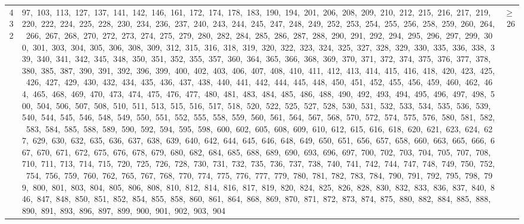 \begin{longtable}{c|p{}|r}
432 & 97,\ 103,\ 113,\ 127,\ 137,\ 141,\ 142,\ 146,\ 161,\ 172,\ 174,\ 178,\ 183,\ 190,\ 194,\ 201,\ 206,\ 208,\ 209,\ 210,\ 212,\ 215,\ 216,\ 217,\ 219,\ 220,\ 222,\ 224,\ 225,\ 228,\ 230,\ 234,\ 236,\ 237,\ 240,\ 243,\ 244,\ 245,\ 247,\ 248,\ 249,\ 252,\ 253,\ 254,\ 255,\ 256,\ 258,\ 259,\ 260,\ 264,\ 266,\ 267,\ 268,\ 270,\ 272,\ 273,\ 274,\ 275,\ 279,\ 280,\ 282,\ 284,\ 285,\ 286,\ 287,\ 288,\ 290,\ 291,\ 292,\ 294,\ 295,\ 296,\ 297,\ 299,\ 300,\ 301,\ 303,\ 304,\ 305,\ 306,\ 308,\ 309,\ 312,\ 315,\ 316,\ 318,\ 319,\ 320,\ 322,\ 323,\ 324,\ 325,\ 327,\ 328,\ 329,\ 330,\ 335,\ 336,\ 338,\ 339,\ 340,\ 341,\ 342,\ 345,\ 348,\ 350,\ 351,\ 352,\ 355,\ 357,\ 360,\ 364,\ 365,\ 366,\ 368,\ 369,\ 370,\ 371,\ 372,\ 374,\ 375,\ 376,\ 377,\ 378,\ 380,\ 385,\ 387,\ 390,\ 391,\ 392,\ 396,\ 399,\ 400,\ 402,\ 403,\ 406,\ 407,\ 408,\ 410,\ 411,\ 412,\ 413,\ 414,\ 415,\ 416,\ 418,\ 420,\ 423,\ 425,\ 426,\ 427,\ 429,\ 430,\ 432,\ 434,\ 435,\ 436,\ 437,\ 438,\ 440,\ 441,\ 442,\ 444,\ 445,\ 448,\ 450,\ 451,\ 452,\ 455,\ 456,\ 459,\ 460,\ 462,\ 464,\ 465,\ 468,\ 469,\ 470,\ 473,\ 474,\ 475,\ 476,\ 477,\ 480,\ 481,\ 483,\ 484,\ 485,\ 486,\ 488,\ 490,\ 492,\ 493,\ 494,\ 495,\ 496,\ 497,\ 498,\ 500,\ 504,\ 506,\ 507,\ 508,\ 510,\ 511,\ 513,\ 515,\ 516,\ 517,\ 518,\ 520,\ 522,\ 525,\ 527,\ 528,\ 530,\ 531,\ 532,\ 533,\ 534,\ 535,\ 536,\ 539,\ 540,\ 544,\ 545,\ 546,\ 548,\ 549,\ 550,\ 551,\ 552,\ 555,\ 558,\ 559,\ 560,\ 561,\ 564,\ 567,\ 568,\ 570,\ 572,\ 574,\ 575,\ 576,\ 580,\ 581,\ 582,\ 583,\ 584,\ 585,\ 588,\ 589,\ 590,\ 592,\ 594,\ 595,\ 598,\ 600,\ 602,\ 605,\ 608,\ 609,\ 610,\ 612,\ 615,\ 616,\ 618,\ 620,\ 621,\ 623,\ 624,\ 627,\ 629,\ 630,\ 632,\ 635,\ 636,\ 637,\ 638,\ 639,\ 640,\ 642,\ 644,\ 645,\ 646,\ 648,\ 649,\ 650,\ 651,\ 656,\ 657,\ 658,\ 660,\ 663,\ 665,\ 666,\ 667,\ 670,\ 671,\ 672,\ 675,\ 676,\ 678,\ 679,\ 680,\ 682,\ 684,\ 685,\ 688,\ 689,\ 690,\ 693,\ 696,\ 697,\ 700,\ 702,\ 703,\ 704,\ 705,\ 707,\ 708,\ 710,\ 711,\ 713,\ 714,\ 715,\ 720,\ 725,\ 726,\ 728,\ 730,\ 731,\ 732,\ 735,\ 736,\ 737,\ 738,\ 740,\ 741,\ 742,\ 744,\ 747,\ 748,\ 749,\ 750,\ 752,\ 754,\ 756,\ 759,\ 760,\ 762,\ 765,\ 767,\ 768,\ 770,\ 774,\ 775,\ 776,\ 777,\ 779,\ 780,\ 781,\ 782,\ 783,\ 784,\ 790,\ 791,\ 792,\ 795,\ 798,\ 799,\ 800,\ 801,\ 803,\ 804,\ 805,\ 806,\ 808,\ 810,\ 812,\ 814,\ 816,\ 817,\ 819,\ 820,\ 824,\ 825,\ 826,\ 828,\ 830,\ 832,\ 833,\ 836,\ 837,\ 840,\ 846,\ 847,\ 848,\ 850,\ 851,\ 852,\ 854,\ 855,\ 858,\ 860,\ 861,\ 864,\ 868,\ 869,\ 870,\ 871,\ 872,\ 873,\ 874,\ 875,\ 880,\ 882,\ 884,\ 885,\ 888,\ 890,\ 891,\ 893,\ 896,\ 897,\ 899,\ 900,\ 901,\ 902,\ 903,\ 904 & $\ge$ 26 \\

\end{longtable}
